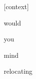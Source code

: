 \documentclass[varwidth]{standalone}
\begin{document}
\begin{CJK*}{UTF8}{gbsn}
{\setlength{\fboxsep}{0pt}\colorbox{white!0}{\parbox{0.9\textwidth}{
\colorbox{red!3.8098968424549184e-11}{\strut [context]} \colorbox{red!4.4880766836286057e-07}{\strut would} \colorbox{red!3.3319048498015036e-07}{\strut you} \colorbox{red!0.009116522036492825}{\strut mind} \colorbox{red!99.99088287353516}{\strut relocating} 
}}}
\end{CJK*}
\end{document}

